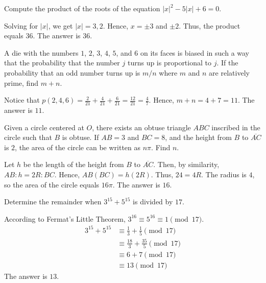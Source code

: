 \begin{problem}
Compute the product of the roots of the equation $|x|^2-5|x|+6=0$.
\end{problem}

\begin{solution}
Solving for $|x|$, we get $|x|=3,2$. Hence, $x=\pm3$ and $\pm2$. Thus, the product equals $36$. The answer is $36$.
\end{solution}

\begin{problem}
A die with the numbers $1$, $2$, $3$, $4$, $5$, and $6$ on its faces is biased in such a way that the probability that the number $j$ turns up is proportional to $j$. If the probability that an odd number turns up is $m/n$ where $m$ and $n$ are relatively prime, find $m+n$.
\end{problem}

\begin{solution}
Notice that $p(2, 4, 6)=\frac{2}{21}+\frac{4}{21}+\frac{6}{21}=\frac{12}{21}=\frac{4}{7}$. Hence, $m+n=4+7=11$. The answer is $11$.
\end{solution}

\begin{problem}
Given a circle centered at $O$, there exists an obtuse triangle $ABC$ inscribed in the circle such that $B$ is obtuse. If $AB=3$ and $BC=8$, and the height from $B$ to $\overline{AC}$ is $2$, the area of the circle can be written as $n\pi$. Find $n$.
\end{problem}

\begin{solution}
Let $h$ be the length of the height from $B$ to $\overline{AC}$. Then, by similarity, $AB:h=2R:BC$. Hence, $AB(BC)=h(2R)$. Thus, $24=4R$. The radius is $4$, so the area of the circle equals $16\pi$. The answer is $16$.
\end{solution}

\begin{problem}
Determine the remainder when $3^{15}+5^{15}$ is divided by $17$. 
\end{problem}

\begin{solution}
According to Fermat's Little Theorem, $3^{16}\equiv 5^{16} \equiv 1 \pmod{17}$.
\begin{align*}
    3^{15}+5^{15} & \equiv \frac13+\frac15 \pmod{17}\\
    & \equiv \frac{18}{3}+\frac{35}{5} \pmod{17}\\
    & \equiv 6+7 \pmod{17}\\
    & \equiv 13 \pmod{17}
\end{align*}
The answer is $13$.
\end{solution}

